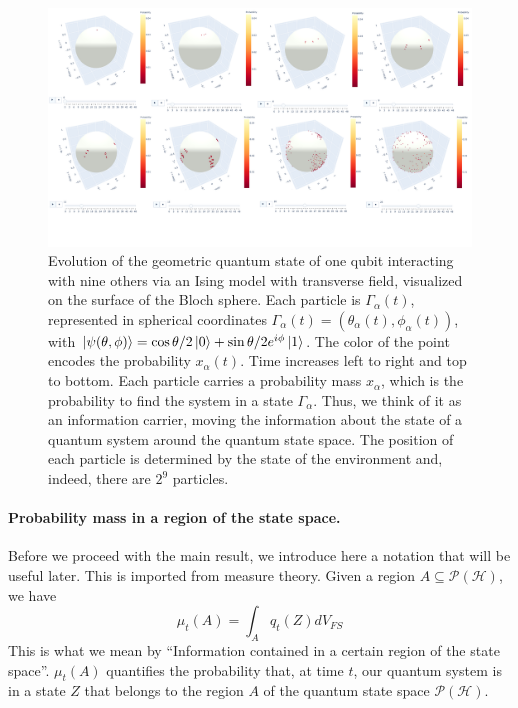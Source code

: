 \documentclass[draft,nofootinbib,pre,twocolumn,showpacs,showkeys,preprintnumbers,floatfix]{revtex4-1}
\newcommand{\1}{\mathbbm{1}}
\newcommand{\PH}{\mathcal{P}(\mathcal{H})}
\begin{document}
\begin{figure}[t!]
\centering
\includegraphics[width=.9\textwidth]{./img/DynamicsLong.pdf}
\caption{Evolution of the geometric quantum state of one qubit interacting with 
	nine others via an Ising model with transverse field, visualized on the surface of the Bloch
	sphere. Each particle is $\Gamma_\alpha(t)$, represented in spherical coordinates 
	$\Gamma_\alpha(t) = \left( \theta_\alpha(t),\phi_\alpha(t)\right)$, with $\ket{\psi(\theta,\phi)} = 
	\cos \theta/2 \ket{0}+ \sin \theta/2 e^{i\phi}\ket{1}$. The color of the point encodes the 
	probability $x_\alpha(t)$. Time increases left to right and top to bottom. Each particle
	carries a probability mass $x_\alpha$, which is the probability to find the system in a 
	state $\Gamma_\alpha$. Thus, we think of it as an information carrier, moving the 
	information about the state of a quantum system around the quantum state space.
	The position of each particle is determined by the state of the environment and, indeed, 
	there are $2^9$ particles.
	}
\label{fig:gqs_dynamics}
\end{figure}
\paragraph*{Probability mass in a region of the state space.} Before we proceed with the
main result, we introduce here a notation that will be useful later. This is imported
from measure theory. Given a region $A \subseteq \PH$, we have
\begin{equation}
\mu_t(A) = \int_A q_t(Z) dV_{FS}
\end{equation}
This is what we mean by ``Information contained in a certain region of the state space''.
$\mu_t(A)$ quantifies the probability that, at time $t$, our quantum system is in a state $Z$ that 
belongs to the region $A$ of the quantum state space $\PH$.
\end{document}
